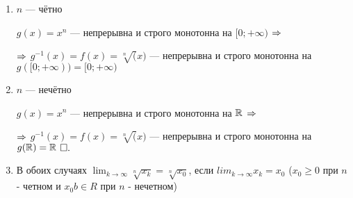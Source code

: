 \documentclass{article}
\begin{document}
\begin{enumerate}
	\item{}$n$ --- чётно

	$g(x)=x^{n}$ ---  непрерывна и строго монотонна на $[0;+\infty)$ $\Rarr$

	$\Rarr$ $g^{-1}(x)=f(x)=\sqrt[n](x)$ --- непрерывна и строго монотонна на $g([0;+\infty))=[0;+\infty)$

	\item{}$n$ --- нечётно

	$g(x)=x^{n}$ ---  непрерывна и строго монотонна на $\R$ $\Rarr$

	$\Rarr$ $g^{-1}(x)=f(x)=\sqrt[n](x)$ --- непрерывна и строго монотонна на $g(\R)=\R$$\qed$
        \item{} В обоих случаях $\lim_{k\to \infty} \sqrt[n]{x_{k}}=\sqrt[n]{x_{0}}$, если $lim_{k\to \infty} x_{k}=x_{0}$ ($x_{0} \geq 0$ при $n$ - четном и $x_{0}b\in R$ при $n$ - нечетном)
\end{enumerate}
\end{document}
